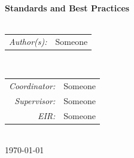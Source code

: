 \begin{titlepage}

\HRule \\[0.6cm]
{ \Huge \bfseries 
Standards and Best Practices
}\\[0.4cm] 

\HRule \\[1cm]
 
\begin{minipage}{0.4\textwidth}
\begin{flushleft} \large
	\begin{tabular} {r l} 
        \emph{Author(s):} & Someone	\\
	\end{tabular}
\end{flushleft}
\end{minipage}
~
\begin{minipage}{0.4\textwidth}
\begin{flushright} \large
	\begin{tabular} {r l} 
		\emph{Coordinator:} & Someone 		\\
		\emph{Supervisor:}  & Someone 		\\
		\emph{EIR:}         & Someone  		        \\
	\end{tabular}
\end{flushright}
\end{minipage}\\[2cm]


{\large \today}\\[2cm] %

\vfill %

\end{titlepage}
